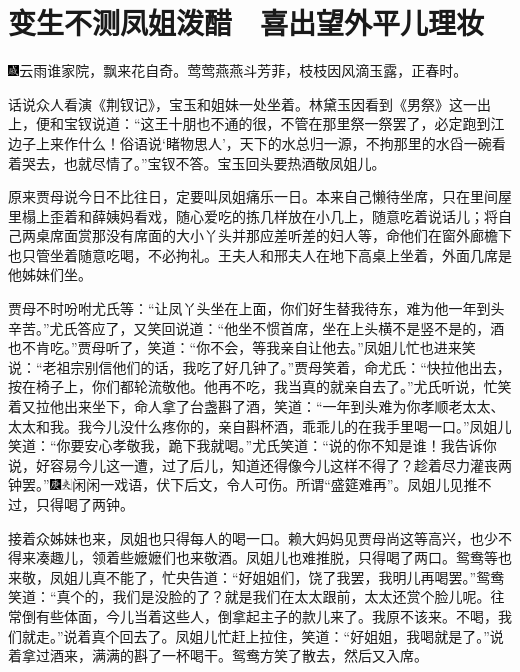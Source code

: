 

\chapter{变生不测凤姐泼醋　喜出望外平儿理妆}

{\includegraphics[width=3mm]{../Images/00005}云雨谁家院，飘来花自奇。莺莺燕燕斗芳菲，枝枝因风滴玉露，正春时。}

话说众人看演《荆钗记》，宝玉和姐妹一处坐着。林黛玉因看到《男祭》这一出上，便和宝钗说道：``这王十朋也不通的很，不管在那里祭一祭罢了，必定跑到江边子上来作什么！俗语说`睹物思人'，天下的水总归一源，不拘那里的水舀一碗看着哭去，也就尽情了。''宝钗不答。宝玉回头要热酒敬凤姐儿。

原来贾母说今日不比往日，定要叫凤姐痛乐一日。本来自己懒待坐席，只在里间屋里榻上歪着和薛姨妈看戏，随心爱吃的拣几样放在小几上，随意吃着说话儿；将自己两桌席面赏那没有席面的大小丫头并那应差听差的妇人等，命他们在窗外廊檐下也只管坐着随意吃喝，不必拘礼。王夫人和邢夫人在地下高桌上坐着，外面几席是他姊妹们坐。

贾母不时吩咐尤氏等：``让凤丫头坐在上面，你们好生替我待东，难为他一年到头辛苦。''尤氏答应了，又笑回说道：``他坐不惯首席，坐在上头横不是竖不是的，酒也不肯吃。''贾母听了，笑道：``你不会，等我亲自让他去。''凤姐儿忙也进来笑说：``老祖宗别信他们的话，我吃了好几钟了。''贾母笑着，命尤氏：``快拉他出去，按在椅子上，你们都轮流敬他。他再不吃，我当真的就亲自去了。''尤氏听说，忙笑着又拉他出来坐下，命人拿了台盏斟了酒，笑道：``一年到头难为你孝顺老太太、太太和我。我今儿没什么疼你的，亲自斟杯酒，乖乖儿的在我手里喝一口。''凤姐儿笑道：``你要安心孝敬我，跪下我就喝。''尤氏笑道：``说的你不知是谁！我告诉你说，好容易今儿这一遭，过了后儿，知道还得像今儿这样不得了？趁着尽力灌丧两钟罢。''{\includegraphics[width=3mm]{../Images/00004}\includegraphics[width=3mm]{../Images/00012}\footnotesize \kaishu 闲闲一戏语，伏下后文，令人可伤。所谓``盛筵难再''。}凤姐儿见推不过，只得喝了两钟。

接着众姊妹也来，凤姐也只得每人的喝一口。赖大妈妈见贾母尚这等高兴，也少不得来凑趣儿，领着些嬷嬷们也来敬酒。凤姐儿也难推脱，只得喝了两口。鸳鸯等也来敬，凤姐儿真不能了，忙央告道：``好姐姐们，饶了我罢，我明儿再喝罢。''鸳鸯笑道：``真个的，我们是没脸的了？就是我们在太太跟前，太太还赏个脸儿呢。往常倒有些体面，今儿当着这些人，倒拿起主子的款儿来了。我原不该来。不喝，我们就走。''说着真个回去了。凤姐儿忙赶上拉住，笑道：``好姐姐，我喝就是了。''说着拿过酒来，满满的斟了一杯喝干。鸳鸯方笑了散去，然后又入席。


